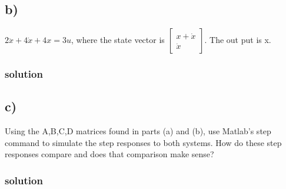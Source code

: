     \subsection{b)} 
    $2\ddot{x} + 4\dot{x} + 4x=3u$, where the state vector is 
    $\begin{bmatrix}
        x + \dot{x} \\
        \dot{x}
    \end{bmatrix}$.
    The out put is x.
    \subsubsection{solution}
    

    \subsection{c)}
    Using the A,B,C,D matrices found in parts (a) and (b), use Matlab's step command to simulate the step responses to both systems. How do these step responses compare and does that comparison make sense? 
    \subsubsection{solution}


\pagebreak